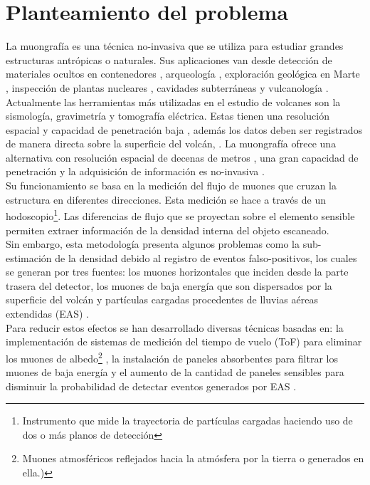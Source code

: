 \chapter{Planteamiento del problema}

La muongrafía es una técnica no-invasiva que se utiliza para estudiar grandes estructuras antrópicas o naturales. Sus aplicaciones van desde detección de materiales ocultos en contenedores \cite{Blanpied2015}, arqueología \cite{Morishima2017, Gmez2016, Alvarez1970}, exploración geológica en Marte \cite{Kedar2013}, inspección de plantas nucleares \cite{Fujii2013}, cavidades subterráneas \cite{Saracino2017} y  vulcanología \cite{Tanaka2005, Tanaka2009, Lesparre2010, Lesparre2011, Lesparre2012}.\\

Actualmente las herramientas más utilizadas en el estudio de volcanes son la sismología, gravimetría y tomografía eléctrica. Estas tienen una resolución espacial y capacidad de penetración baja \cite{RosasCarbajal2017}, además los datos deben ser registrados de manera directa sobre la superficie del volcán, \cite{Marteau2012}. La muongrafía ofrece una alternativa con resolución espacial de decenas de metros \cite{Lesparre2012}, una gran capacidad de penetración y la adquisición de información es no-invasiva \cite{Nishiyama2014}.\\

Su funcionamiento se basa en la medición del flujo de muones que cruzan la estructura en diferentes direcciones. Esta medición se hace a través de un hodoscopio\footnote{Instrumento que mide la trayectoria de partículas cargadas haciendo uso de dos o más planos de detección}. Las diferencias de flujo que se proyectan sobre el elemento sensible permiten extraer información de la densidad interna del objeto escaneado.\\

Sin embargo, esta metodología presenta algunos problemas como la sub-estimación de la densidad debido al registro de eventos falso-positivos, los cuales se generan por tres fuentes: los muones horizontales que inciden desde la parte trasera del detector, los muones de baja energía que son dispersados por la superficie del volcán y partículas cargadas procedentes de lluvias aéreas extendidas (EAS) \cite{Nishiyama2014,Gomez2017}.\\

Para reducir estos efectos se han desarrollado diversas técnicas basadas en: la implementación de sistemas de medición del tiempo de vuelo (ToF) para eliminar los muones de albedo\footnote{Muones atmosféricos reflejados hacia la atmósfera por la tierra o generados en ella.)} \cite{Marteau2014, Cimmino2017}, la instalación de paneles absorbentes para filtrar los muones de baja energía y el aumento de la cantidad de paneles sensibles para disminuir la probabilidad de detectar eventos generados por EAS \cite{Lesparre2012}.\\

